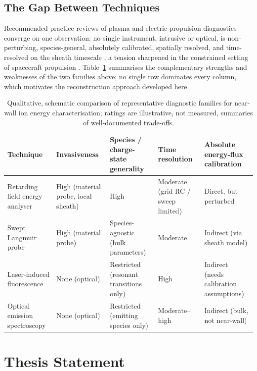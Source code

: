 \subsection{The Gap Between Techniques}

Recommended-practice reviews of plasma and electric-propulsion diagnostics converge on one observation: no single instrument, intrusive or optical, is non-perturbing, species-general, absolutely calibrated, spatially resolved, and time-resolved on the sheath timescale \cite{ref0490,ref0511,ref0506}, a tension sharpened in the constrained setting of spacecraft propulsion \cite{ref0496}. Table~\ref{ch01-tab:diagnostics} summarises the complementary strengths and weaknesses of the two families above; no single row dominates every column, which motivates the reconstruction approach developed here.

\begin{table}[htbp]
\centering
\caption{Qualitative, schematic comparison of representative diagnostic families for near-wall ion energy characterisation; ratings are illustrative, not measured, summaries of well-documented trade-offs.}
\label{ch01-tab:diagnostics}
\begin{tabularx}{\textwidth}{@{}l X X X X@{}}
\toprule
Technique & Invasiveness & Species / charge-state generality & Time resolution & Absolute energy-flux calibration \\
\midrule
Retarding field energy analyser & High (material probe, local sheath) & High & Moderate (grid RC / sweep limited) & Direct, but perturbed \\
Swept Langmuir probe & High (material probe) & Species-agnostic (bulk parameters) & Moderate & Indirect (via sheath model) \\
Laser-induced fluorescence & None (optical) & Restricted (resonant transitions only) & High & Indirect (needs calibration assumptions) \\
Optical emission spectroscopy & None (optical) & Restricted (emitting species only) & Moderate--high & Indirect (bulk, not near-wall) \\
\bottomrule
\end{tabularx}
\end{table}

\section{Thesis Statement}

